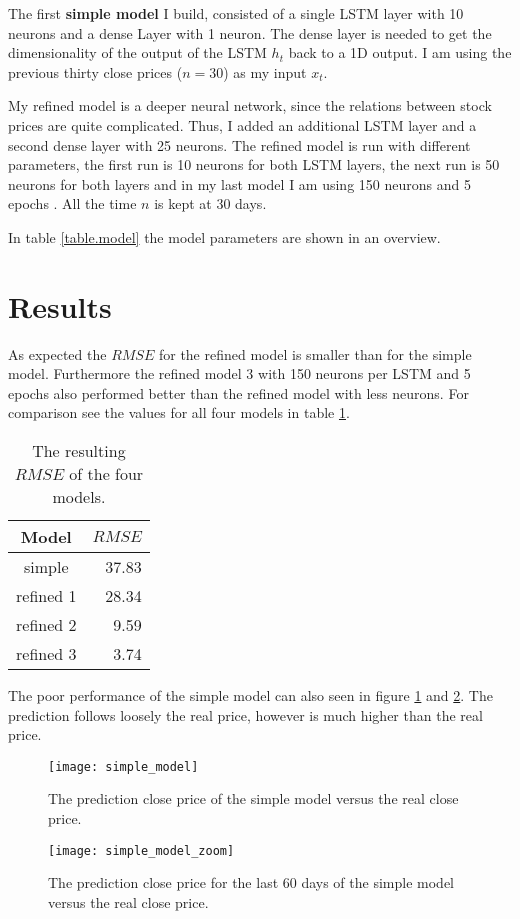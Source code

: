 \documentclass[fleqn,10pt]{SelfArx} %
\begin{document}
The first \textbf{simple model} I build, consisted of a single LSTM layer with 10 neurons and a dense Layer with 1 neuron. The dense layer is needed to get the dimensionality of the output of the LSTM $h_t$ back to a 1D output. I am using the previous thirty close prices ($n=30$) as my input $x_t$.

My refined model is a deeper neural network, since the relations between stock prices are quite complicated. Thus, I added an additional LSTM layer and a second dense layer with 25 neurons. The refined model is run with different parameters, the first run is 10 neurons for both LSTM layers, the next run is 50 neurons for both layers and in my last model I am using 150 neurons and 5 epochs . All the time $n$ is kept at $30$ days.

In table \ref{table.model} the model parameters are shown in an overview.


\section{Results}
As expected the $RMSE$ for the refined model is smaller than for the simple model. Furthermore the refined model 3 with 150 neurons per LSTM and 5 epochs also performed better than the refined model with less neurons. For comparison see the values for all four models in table \ref{tab:rsme}.
\begin{table}[H]
	\caption{The resulting $RMSE$ of the four models.}
	\centering
	\begin{tabular}{cr}
	\hline 
	Model & $RMSE$ \\ 
	\hline 
	simple & 37.83 \\ 
	refined 1 & 28.34 \\ 
	refined 2 & 9.59 \\ 
	refined 3 & 3.74 \\ 
	\hline 
	\end{tabular} 
	\label{tab:rsme}
\end{table}
The poor performance of the simple model can also seen in figure \ref{fig:simple} and \ref{fig:simple_zoom}. The prediction follows loosely the real price, however is much higher than the real price.
\begin{figure}[ht]\centering
	\texttt{[image: simple\_model]}
	\caption{The prediction close price of the simple model versus the real close price.}
	\label{fig:simple}
\end{figure}

\begin{figure}[ht]\centering
	\texttt{[image: simple\_model\_zoom]}
	\caption{The prediction close price for the last 60 days of the simple model versus the real close price.}
	\label{fig:simple_zoom}
\end{figure}
\end{document}
